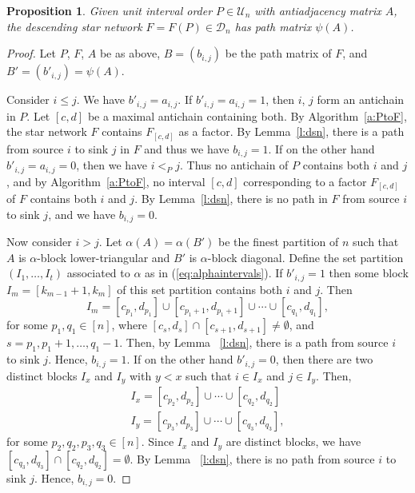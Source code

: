 \documentclass[12pt]{amsart}
\newtheorem{prop}[thm]{Proposition}
\theoremstyle{definition}
\numberwithin{equation}{section}
\begin{document}
\begin{prop}\label{p:P A F psiA}
  Given unit interval order $P \in \mathcal U_n$
  with antiadjacency matrix $A$,
  the descending star network $F = F(P) \in \mathcal D_n$
  has path matrix $\psi(A)$.
\end{prop}
\begin{proof}
  Let $P$, $F$, $A$ be as above, $B = (b_{i,j})$ be the path matrix of $F$,
  and $B' = (b'_{i,j}) = \psi(A)$.

  Consider $i \leq j$.  We have $b'_{i,j} = a_{i,j}$.
  If $b'_{i,j} = a_{i,j} = 1$, then $i$, $j$ form an antichain in $P$.
  Let $[c,d]$ be a maximal antichain containing both.
  By Algorithm~\ref{a:PtoF}, the star network $F$ contains $F_{[c,d]}$
  as a factor.  By Lemma~\ref{l:dsn},
  there is a path from source $i$ to sink $j$
  in $F$ and thus we have $b_{i,j} = 1$.
  If on the other hand $b'_{i,j} = a_{i,j} = 0$,
  then we have $i <_P j$.
  Thus no antichain of $P$ contains both $i$ and $j$, and
  by Algorithm~\ref{a:PtoF}, no interval $[c,d]$ corresponding to a
  factor $F_{[c,d]}$ of $F$ contains both $i$ and $j$.
  By Lemma~\ref{l:dsn},
  there is no path in $F$ from source $i$ to sink $j$, and we have $b_{i,j} = 0$.

  Now consider $i > j$.  Let $\alpha(A) = \alpha(B')$ be the
  finest partition of $n$ such that $A$ is $\alpha$-block lower-triangular
  and $B'$ is $\alpha$-block diagonal.
  Define the set partition $(I_1,\dotsc,I_t)$ associated to $\alpha$
  as in (\ref{eq:alphaintervals}).
  If $b'_{i,j} = 1$ then some block $I_m = [k_{m-1}+1,k_m]$ of this set partition
  contains both $i$ and $j$. Then \begin{equation*}
      I_m = [c_{{p_1}},d_{p_1}] \cup [c_{p_1+1},d_{p_1+1}] \cup \cdots \cup [c_{q_1},d_{q_1}],
  \end{equation*} for some $p_1,q_1 \in[n]$, where $[c_s,d_s] \cap [c_{s+1},d_{s+1}] \neq \emptyset$, and $s = p_1 ,p_1+1 , \dotsc, q_1-1$. Then, by Lemma ~\ref{l:dsn}, there is a path from source $i$ to sink $j$. Hence, $b_{i,j} = 1$. If on the other hand $b'_{i,j} = 0$, then there are two distinct blocks $I_{x}$ and $I_{y}$ with $y<x$ such that $i\in I_x$ and $j\in I_y$. Then, \begin{gather*}
      I_x  = [c_{p_2},d_{p_2}] \cup \cdots \cup [c_{q_2},d_{q_2}]  \\
      I_y  = [c_{p_3},d_{p_3}] \cup \cdots \cup [c_{q_3},d_{q_3}],
  \end{gather*} for some $p_2,q_2,p_3,q_3 \in [n]$. Since $I_x$ and $I_y$ are distinct blocks, we have $[c_{q_3},d_{q_3}] \cap [c_{q_2},d_{q_2}] = \emptyset$. By Lemma ~\ref{l:dsn}, there is no path from source $i$ to sink $j$. Hence, $b_{i,j} = 0$.

\end{proof}
\end{document}
